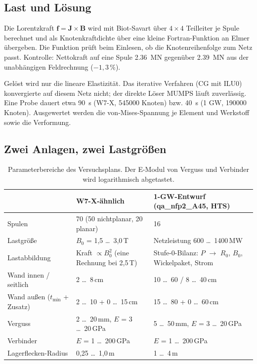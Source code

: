 \documentclass[10pt,a4paper]{article}
\begin{document}
\subsection{Last und Lösung}
Die Lorentzkraft $\mathbf f = \mathbf J\times\mathbf B$ wird mit Biot-Savart über $4\times4$ Teilleiter je
Spule berechnet und als Knotenkraftdichte über eine kleine Fortran-Funktion an Elmer \cite{elmer} übergeben. Die
Funktion prüft beim Einlesen, ob die Knotenreihenfolge zum Netz passt. Kontrolle: Nettokraft auf eine Spule
\SI{2,36}{MN} gegenüber \SI{2,39}{MN} aus der unabhängigen Feldrechnung ($-1{,}3\,\%$).

Gelöst wird nur die lineare Elastizität. Das iterative Verfahren (CG mit ILU0) konvergierte auf diesem Netz
nicht; der direkte Löser MUMPS \cite{mumps} läuft zuverlässig. Eine Probe dauert etwa \SI{90}{s} (W7-X,
\num{545000} Knoten) bzw. \SI{40}{s} (1 GW, \num{190000} Knoten). Ausgewertet werden die von-Mises-Spannung je
Element und Werkstoff sowie die Verformung.

\subsection{Zwei Anlagen, zwei Lastgrößen}
\begin{table}[H]\centering\small
\begin{tabularx}{\linewidth}{@{}lXX@{}}\toprule
 & W7-X-ähnlich & 1-GW-Entwurf (qa\_nfp2\_A45, HTS) \\\midrule
Spulen & 70 (50 nichtplanar, 20 planar) & 16 \\
Lastgröße & $B_0$ = 1,5 \ldots\ 3,0\,T & Netzleistung 600 \ldots\ 1400\,MW \\
Lastabbildung & Kraft $\propto B_0^2$ (eine Rechnung bei 2,5\,T) & Stufe-0-Bilanz: $P$ $\to$ $R_0$, $B_0$,
  Wickelpaket, Strom \\
Wand innen / seitlich & 2 \ldots\ 8\,cm & 10 \ldots\ 60 / 8 \ldots\ 40\,cm \\
Wand außen ($t_\text{min}$ + Zusatz) & 2 \ldots\ 10 + 0 \ldots\ 15\,cm & 15 \ldots\ 80 + 0 \ldots\ 60\,cm \\
Verguss & 2 \ldots\ 20\,mm, $E$ = 3 \ldots\ 20\,GPa & 5 \ldots\ 50\,mm, $E$ = 3 \ldots\ 20\,GPa \\
Verbinder & $E$ = 1 \ldots\ 200\,GPa & $E$ = 1 \ldots\ 200\,GPa \\
Lagerflecken-Radius & 0,25 \ldots\ 1,0\,m & 1 \ldots\ 4\,m \\\bottomrule
\end{tabularx}\caption{Parameterbereiche des Versuchsplans. Der E-Modul von Verguss und Verbinder wird
logarithmisch abgetastet.}\end{table}
\end{document}
